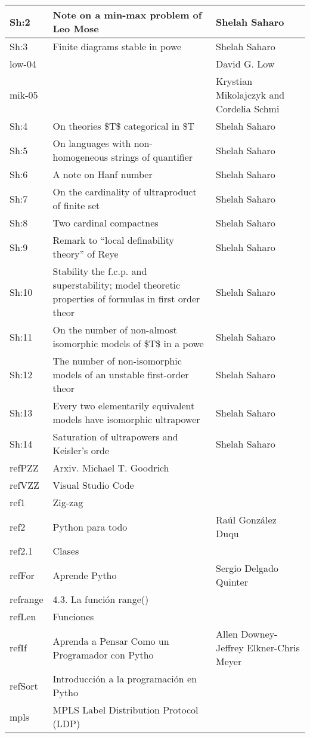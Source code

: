 \documentclass{article}
\begin{document}
\begin{longtable}{|p{}|p{}|p{}|}
\hline
Sh:2&Note on a min-max problem of Leo Mose&Shelah Saharo\\
\hline
Sh:3&Finite diagrams stable in powe&Shelah Saharo\\
\hline
low-04&&David G. Low\\
\hline
mik-05&&Krystian Mikolajczyk and Cordelia Schmi\\
\hline
Sh:4&On theories \$T\$ categorical in \$T&Shelah Saharo\\
\hline
Sh:5&On languages with non-homogeneous strings of quantifier&Shelah Saharo\\
\hline
Sh:6&A note on Hanf number&Shelah Saharo\\
\hline
Sh:7&On the cardinality of ultraproduct of finite set&Shelah Saharo\\
\hline
Sh:8&Two cardinal compactnes&Shelah Saharo\\
\hline
Sh:9&Remark to ``local definability theory'' of Reye&Shelah Saharo\\
\hline
Sh:10&Stability the f.c.p. and superstability; model theoretic properties of formulas in first order theor&Shelah Saharo\\
\hline
Sh:11&On the number of non-almost isomorphic models of \$T\$ in a powe&Shelah Saharo\\
\hline
Sh:12&The number of non-isomorphic models of an unstable first-order theor&Shelah Saharo\\
\hline
Sh:13&Every two elementarily equivalent models have isomorphic ultrapower&Shelah Saharo\\
\hline
Sh:14&Saturation of ultrapowers and Keisler's orde&Shelah Saharo\\
\hline
refPZZ&Arxiv. Michael T. Goodrich&\\
\hline
refVZZ&Visual Studio Code&\\
\hline
ref1&Zig-zag&\\
\hline
ref2&Python para todo&Raúl González Duqu\\
\hline
ref2.1&Clases&\\
\hline
refFor&Aprende Pytho&Sergio Delgado Quinter\\
\hline
refrange&4.3. La función range()&\\
\hline
refLen&Funciones&\\
\hline
refIf&Aprenda a Pensar Como un Programador con Pytho&Allen Downey-Jeffrey Elkner-Chris Meyer\\
\hline
refSort&Introducción a la programación en Pytho&\\
\hline
mpls&MPLS Label Distribution Protocol (LDP)&\\

\end{longtable}
\end{document}
